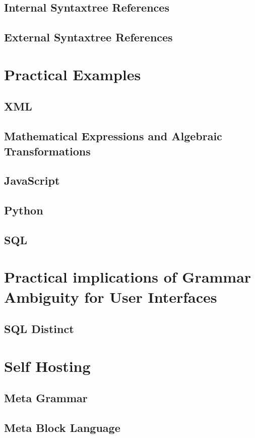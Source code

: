 \subsection{Internal Syntaxtree References}

\subsection{External Syntaxtree References}

\section{Practical Examples}

\subsection{XML}

\subsection{Mathematical Expressions and Algebraic Transformations}

\subsection{JavaScript}

\subsection{Python}

\subsection{SQL}

\section{Practical implications of Grammar Ambiguity for User Interfaces}

\subsection{SQL Distinct}

\section{Self Hosting}

\subsection{Meta Grammar}

\subsection{Meta Block Language}


